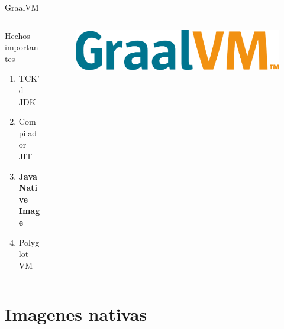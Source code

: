 \documentclass[aspectratio=169]{beamer}
\begin{document}
\begin{frame}{GraalVM}

	\begin{columns}[T] %

		\begin{column}[T]{4cm} %
			Hechos importantes
		\begin{enumerate}
			\item TCK'd JDK
			\item Compilador JIT
			\item \textbf{Java Native Image}
			\item Polyglot VM
		\end{enumerate}
		\end{column}
		\begin{column}[T]{6cm} %
			\begin{figure}
				\centering
				\includegraphics[width=\linewidth]{Images/graalvmlogo}

			\end{figure}

		\end{column}
	\end{columns}


\end{frame}

{
	\section{Imagenes nativas}
}
\end{document}

